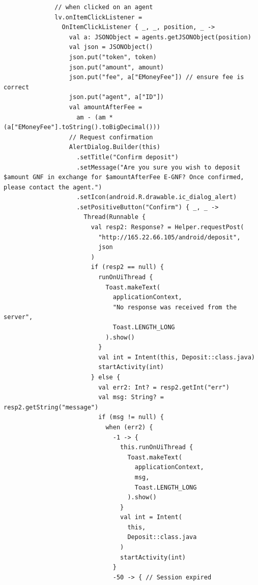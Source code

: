 \documentclass[11pt, a4paper]{article}
\begin{document}
\begin{appendices}
\begin{lstlisting}
              // when clicked on an agent
              lv.onItemClickListener =
                OnItemClickListener { _, _, position, _ ->
                  val a: JSONObject = agents.getJSONObject(position)
                  val json = JSONObject()
                  json.put("token", token)
                  json.put("amount", amount)
                  json.put("fee", a["EMoneyFee"]) // ensure fee is correct
                  json.put("agent", a["ID"])
                  val amountAfterFee =
                    am - (am * (a["EMoneyFee"].toString().toBigDecimal()))
                  // Request confirmation
                  AlertDialog.Builder(this)
                    .setTitle("Confirm deposit")
                    .setMessage("Are you sure you wish to deposit $amount GNF in exchange for $amountAfterFee E-GNF? Once confirmed, please contact the agent.")
                    .setIcon(android.R.drawable.ic_dialog_alert)
                    .setPositiveButton("Confirm") { _, _ ->
                      Thread(Runnable {
                        val resp2: Response? = Helper.requestPost(
                          "http://165.22.66.105/android/deposit",
                          json
                        )
                        if (resp2 == null) {
                          runOnUiThread {
                            Toast.makeText(
                              applicationContext,
                              "No response was received from the server",
                              Toast.LENGTH_LONG
                            ).show()
                          }
                          val int = Intent(this, Deposit::class.java)
                          startActivity(int)
                        } else {
                          val err2: Int? = resp2.getInt("err")
                          val msg: String? = resp2.getString("message")
                          if (msg != null) {
                            when (err2) {
                              -1 -> {
                                this.runOnUiThread {
                                  Toast.makeText(
                                    applicationContext,
                                    msg,
                                    Toast.LENGTH_LONG
                                  ).show()
                                }
                                val int = Intent(
                                  this,
                                  Deposit::class.java
                                )
                                startActivity(int)
                              }
                              -50 -> { // Session expired

\end{lstlisting}
\end{appendices}
\end{document}

